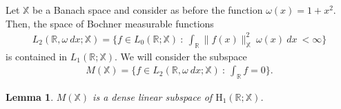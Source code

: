 \documentclass[psamsfonts]{amsart}
\newtheorem{lemma}[theorem]{Lemma}
\newcommand{\R}{\mathbb{R}}
\newcommand{\Lone}{L_1}
\newcommand{\Ltwo}{L_2}
\newcommand{\Hone}{\mathrm{H}_1}
\begin{document}
    Let $\mathbb{\mathbb{X}}$ be a Banach space and consider as before
    the function $\omega(x) = 1+x^2$. Then, the space of Bochner measurable functions
    \begin{align*}
        \Ltwo(\R,\omega \ dx; \mathbb{\mathbb{X}}) = \big\{ f \in L_0(\R;\mathbb{\mathbb{X}}) \ : \ \int_{\R} \|f(x)\|^2_\mathbb{\mathbb{X}} \ \omega(x) \ dx \ < \infty \big\}
    \end{align*}
    is contained in $\Lone(\R;\mathbb{\mathbb{X}})$. We will consider the subspace
    \begin{align*}
        M(\mathbb{\mathbb{X}}) = \big\{f \in \Ltwo(\R, \omega \ dx ; \mathbb{\mathbb{X}}) \ : \ \int_{\R} f = 0 \big\}.
    \end{align*}

    \begin{lemma}
        $M(\mathbb{\mathbb{X}})$ is a dense linear subspace of $\Hone(\R;\mathbb{\mathbb{X}})$.
    \end{lemma}
\end{document}
